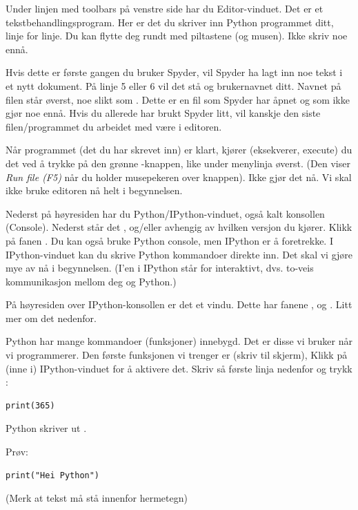 Under linjen med toolbars på venstre side har du Editor-vinduet. Det er et tekstbehandlingsprogram.  Her er det du skriver inn Python programmet ditt, linje for linje. Du kan flytte deg rundt med piltastene (og musen). Ikke skriv noe ennå. 

Hvis dette er første gangen du bruker Spyder, vil Spyder ha lagt inn noe tekst i et nytt dokument. På linje 5 eller 6 vil det stå  og brukernavnet ditt. Navnet på filen står øverst, noe slikt som . Dette er en fil som Spyder har åpnet og som ikke gjør noe ennå. Hvis du allerede har brukt Spyder litt, vil kanskje den siste filen/programmet du arbeidet med være i editoren.

Når programmet (det du har skrevet inn) er klart, kjører (eksekverer, execute) du det ved å trykke på den grønne -knappen, like under menylinja øverst. (Den viser \emph{Run file (F5)} når du holder musepekeren over knappen). Ikke gjør det nå. Vi skal ikke bruke editoren nå helt i begynnelsen.

Nederst på høyresiden har du Python/IPython-vinduet, også kalt konsollen (Console). Nederst står det ,  og/eller  avhengig av hvilken versjon du kjører. Klikk på fanen . Du kan også bruke Python console, men IPython er å foretrekke. I IPython-vinduet kan du skrive Python kommandoer direkte inn. Det skal vi gjøre mye av nå i begynnelsen. (I'en i IPython står for interaktivt, dvs. to-veis kommunikasjon mellom deg og Python.)

På høyresiden over IPython-konsollen er det et vindu. Dette har fanene ,  og . Litt mer om det nedenfor. 

Python har mange kommandoer (funksjoner) innebygd. Det er disse vi bruker når vi programmerer. Den første funksjonen vi trenger er  (skriv til skjerm), Klikk på (inne i) IPython-vinduet for å aktivere det. Skriv så første linja nedenfor og trykk :
\begin{lstlisting}
print(365)
\end{lstlisting}
Python skriver ut .

Prøv:
\begin{lstlisting}
print("Hei Python")
\end{lstlisting}

(Merk at tekst må stå innenfor hermetegn)

